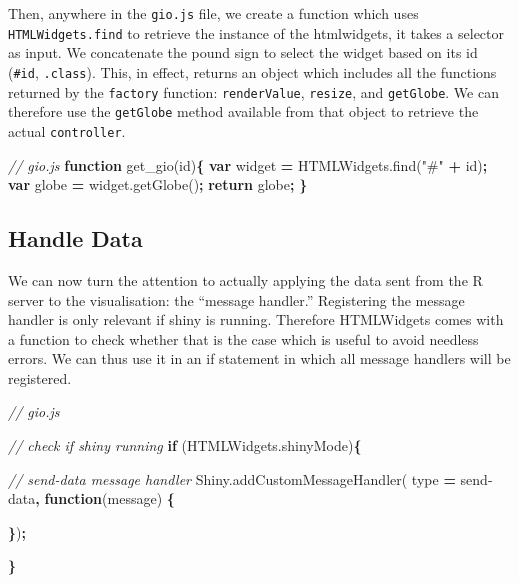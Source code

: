 \documentclass[
  10pt,
]{krantz}
\makeatletter
\newenvironment{Shaded}{\begin{snugshade}}{\end{snugshade}}
\newcommand{\AttributeTok}[1]{\textcolor[rgb]{0.61,0.61,0.61}{#1}}
\newcommand{\CommentTok}[1]{\textcolor[rgb]{0.37,0.37,0.37}{\textit{#1}}}
\newcommand{\ControlFlowTok}[1]{\textcolor[rgb]{0.27,0.27,0.27}{\textbf{#1}}}
\newcommand{\KeywordTok}[1]{\textcolor[rgb]{0.27,0.27,0.27}{\textbf{#1}}}
\newcommand{\NormalTok}[1]{#1}
\newcommand{\OperatorTok}[1]{\textcolor[rgb]{0.43,0.43,0.43}{\textbf{#1}}}
\newcommand{\StringTok}[1]{\textcolor[rgb]{0.5,0.5,0.5}{#1}}
\newcommand{\VariableTok}[1]{\textcolor[rgb]{0,0,0}{#1}}
\newenvironment{kframe}{%
\medskip{}
\setlength{\fboxsep}{.8em}
 \def\at@end@of@kframe{}%
 \ifinner\ifhmode%
  \def\at@end@of@kframe{\end{minipage}}%
  \begin{minipage}{\columnwidth}%
 \fi\fi%
 \def\FrameCommand##1{\hskip\@totalleftmargin \hskip-\fboxsep
 \colorbox{shadecolor}{##1}\hskip-\fboxsep
     \hskip-\linewidth \hskip-\@totalleftmargin \hskip\columnwidth}%
 \MakeFramed {\advance\hsize-\width
   \@totalleftmargin\z@ \linewidth\hsize
   \@setminipage}}%
 {\par\unskip\endMakeFramed%
 \at@end@of@kframe}
\renewenvironment{Shaded}{\begin{kframe}}{\end{kframe}}
\makeatother
\begin{document}
Then, anywhere in the \texttt{gio.js} file, we create a function which uses \texttt{HTMLWidgets.find} to retrieve the instance of the htmlwidgets, it takes a selector as input. We concatenate the pound sign to select the widget based on its id (\texttt{\#id}, \texttt{.class}). This, in effect, returns an object which includes all the functions returned by the \texttt{factory} function: \texttt{renderValue}, \texttt{resize}, and \texttt{getGlobe}. We can therefore use the \texttt{getGlobe} method available from that object to retrieve the actual \texttt{controller}.

\begin{Shaded}
\begin{Highlighting}[]
\CommentTok{// gio.js}
\KeywordTok{function} \AttributeTok{get\_gio}\NormalTok{(id)}\OperatorTok{\{}
  \KeywordTok{var}\NormalTok{ widget }\OperatorTok{=} \VariableTok{HTMLWidgets}\NormalTok{.}\AttributeTok{find}\NormalTok{(}\StringTok{"\#"} \OperatorTok{+}\NormalTok{ id)}\OperatorTok{;}
  \KeywordTok{var}\NormalTok{ globe }\OperatorTok{=} \VariableTok{widget}\NormalTok{.}\AttributeTok{getGlobe}\NormalTok{()}\OperatorTok{;}
  \ControlFlowTok{return}\NormalTok{ globe}\OperatorTok{;}
\OperatorTok{\}}
\end{Highlighting}
\end{Shaded}

\hypertarget{shiny-widgets-handle-data}{%
\subsection{Handle Data}\label{shiny-widgets-handle-data}}

We can now turn the attention to actually applying the data sent from the R server to the visualisation: the ``message handler.'' Registering the message handler is only relevant if shiny is running. Therefore HTMLWidgets comes with a function to check whether that is the case which is useful to avoid needless errors. We can thus use it in an if statement in which all message handlers will be registered.

\begin{Shaded}
\begin{Highlighting}[]
\CommentTok{// gio.js}

\CommentTok{// check if shiny running}
\ControlFlowTok{if}\NormalTok{ (}\VariableTok{HTMLWidgets}\NormalTok{.}\AttributeTok{shinyMode}\NormalTok{)}\OperatorTok{\{}

  \CommentTok{// send{-}data message handler}
  \VariableTok{Shiny}\NormalTok{.}\AttributeTok{addCustomMessageHandler}\NormalTok{(}
\NormalTok{    type }\OperatorTok{=} \StringTok{\textquotesingle{}send{-}data\textquotesingle{}}\OperatorTok{,} \KeywordTok{function}\NormalTok{(message) }\OperatorTok{\{}

  \OperatorTok{\}}\NormalTok{)}\OperatorTok{;}

\OperatorTok{\}}
\end{Highlighting}
\end{Shaded}
\end{document}
